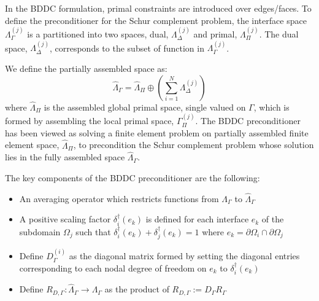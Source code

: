 In the BDDC formulation, primal constraints are introduced over edges/faces. To define the preconditioner for the Schur complement problem, the interface space $ \Lambda_{\Gamma}^{(j)} $ is a partitioned into two spaces, dual, $ \Lambda_{\Delta}^{(j)} $  and primal, $ \Lambda_{\Pi}^{(j)} $. The dual space, $ \Lambda_{\Delta}^{(j)} $, corresponds to the subset of function in $ \Lambda_{\Gamma}^{(j)} $.

We define the partially assembled space as:
\begin{equation} \label{eq:dp}
\hat{\Lambda}_{\Gamma} = \hat{\Lambda}_{\Pi} \oplus (\sum_{i = 1}^{N} \Lambda_{\Delta}^{(j)})
\end{equation}
where $ \hat{\Lambda}_{\Pi} $ is the assembled global primal space, single valued on $ \Gamma $, which is formed by assembling the local primal space, $ \Gamma_{\Pi}^{(j)} $. The BDDC preconditioner has been viewed as solving a finite element problem on partially assembled finite element space, $ \hat{\Lambda}_{\Pi} $, to precondition the Schur complement problem whose solution lies in the fully assembled space $ \hat{\Lambda}_{\Gamma} $.

The key components of the BDDC preconditioner \cite{eisenstat1981efficient} are the following:
\begin{itemize}
	\item 	An averaging operator which restricts functions from $ \Lambda_{\Gamma} $  to $ \hat{\Lambda}_{\Gamma} $
	\item	A positive scaling factor $ \delta_{i}^{\dagger} (e_k) $ is defined for each interface $ e_k $ of the subdomain $ \Omega_j $ such that $ \delta_{i}^{\dagger} (e_k) + \delta_{j}^{\dagger}(e_{k}) = 1 $ where $ e_k = \partial \Omega_i \cap \partial \Omega_j$
	\item	Define $ D_{\Gamma}^{(i)} $ as the diagonal matrix formed by setting the diagonal entries corresponding to each nodal degree of freedom on $ e_k $ to $ \delta_{i}^{\dagger} (e_k) $
	\item	Define $ R_{D, \Gamma} : \hat{\Lambda}_{\Gamma} \rightarrow \Lambda_\Gamma$ as the product of $ R_{D, \Gamma} := D_{\Gamma} R_{\Gamma} $
\end{itemize}


